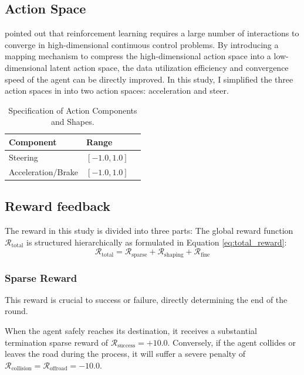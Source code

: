     \subsection{Action Space}
    \cite{corrado_simulation-acquired_2022} pointed out that reinforcement learning requires a large number of interactions to converge in high-dimensional continuous control problems. By introducing a mapping mechanism to compress the high-dimensional action space into a low-dimensional latent action space, the data utilization efficiency and convergence speed of the agent can be directly improved. In this study, I simplified the three action spaces in \cite{elallid_improving_2024} into two action spaces: acceleration and steer.

    \begin{table}[htbp]
    \centering
    \caption{Specification of Action Components and Shapes.}
    \label{tab:action_shapes}
    \begin{tabular}{lll}
    \toprule
    \textbf{Component} & \textbf{Range} \\
    \midrule
    Steering & $[-1.0, 1.0]$ \\
    \addlinespace
    Acceleration/Brake  & $[-1.0, 1.0]$ \\    \bottomrule    
    \end{tabular}
    \end{table}

    \subsection{Reward feedback}
    The reward in this study is divided into three parts: 
    The global reward function $\mathcal{R}_{\text{total}}$ is structured hierarchically as formulated in Equation \ref{eq:total_reward}:
    \begin{equation}
        \mathcal{R}_{\text{total}} = \mathcal{R}_{\text{sparse}} + \mathcal{R}_{\text{shaping}} + \mathcal{R}_{\text{fine}}
        \label{eq:total_reward}
    \end{equation}
    \subsubsection{Sparse Reward}
    This reward is crucial to success or failure, directly determining the end of the round.

    When the agent safely reaches its destination, it receives a substantial termination sparse reward of $\mathcal{R}_{\text{success}} = +10.0$. Conversely, if the agent collides or leaves the road during the process, it will suffer a severe penalty of $\mathcal{R}_{\text{collision}} = \mathcal{R}_{\text{offroad}} = -10.0$.
    
